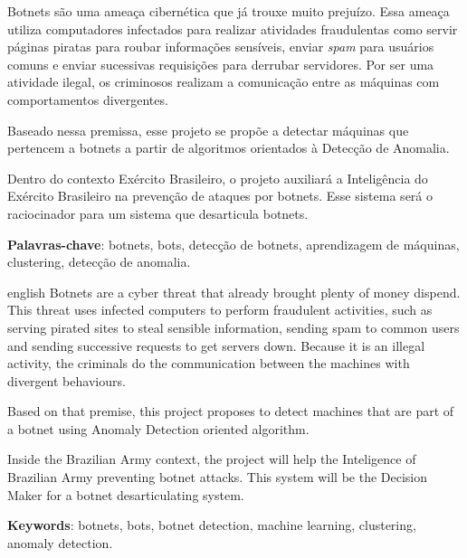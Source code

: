 \begin{resumo}
	Botnets são uma ameaça cibernética que já trouxe muito prejuízo\cite{silva2013botnets}. Essa ameaça utiliza computadores infectados para realizar atividades fraudulentas como servir páginas piratas para roubar informações sensíveis, enviar \textit{spam} para usuários comuns e enviar sucessivas requisições para derrubar servidores. Por ser uma atividade ilegal, os criminosos realizam a comunicação entre as máquinas com comportamentos divergentes.
	
	Baseado nessa premissa, esse projeto se propõe a detectar máquinas que pertencem a botnets a partir de algoritmos orientados à Detecção de Anomalia. 
	
	Dentro do contexto Exército Brasileiro, o projeto auxiliará a Inteligência do Exército Brasileiro na prevenção de ataques por botnets. Esse sistema será o raciocinador para um sistema que desarticula botnets.

	\vspace{\onelineskip}
	\noindent
	\textbf{Palavras-chave}: botnets, bots, detecção de botnets, aprendizagem de máquinas, clustering, detecção de anomalia.
\end{resumo}

\begin{resumo}[Abstract]
	\begin{otherlanguage*}{english}
		Botnets are a cyber threat that already brought plenty of money dispend\cite{silva2013botnets}. This threat uses infected computers to perform fraudulent activities, such as serving pirated sites to steal sensible information, sending spam to common users and sending successive requests to get servers down. Because it is an illegal activity, the criminals do the communication between the machines with divergent behaviours.
		
		Based on that premise, this project proposes to detect machines that are part of a botnet using Anomaly Detection oriented algorithm.

		Inside the Brazilian Army context, the project will help the Inteligence of Brazilian Army preventing botnet attacks. This system will be the Decision Maker for a botnet desarticulating system.

		\vspace{\onelineskip}
		\noindent
		\textbf{Keywords}: botnets, bots, botnet detection, machine learning, clustering, anomaly detection.
	\end{otherlanguage*}
\end{resumo}
